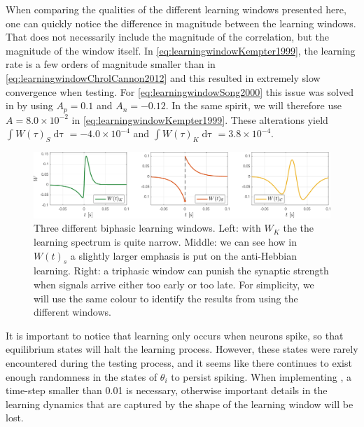 When comparing the qualities of the different learning windows presented here, one can quickly notice the difference in magnitude between the learning windows. That does not necessarily include the magnitude of the correlation, but the magnitude of the window itself. In \eqref{eq:learningwindowKempter1999}, the learning rate is a few orders of magnitude smaller than in \eqref{eq:learningwindowChrolCannon2012} and this resulted in extremely slow convergence when testing. For \eqref{eq:learningwindowSong2000} this issue was solved in \cite{ChrolCannon2012} by using $A _p = 0.1$ and $A_n = -0.12$. In the same spirit, we will therefore use $A = 8.0 \times 10^{-2}$ in \eqref{eq:learningwindowKempter1999}. These alterations yield $\int W(\tau)_S \mathop{d \tau} = -4.0 \times 10^{-4}$ and $\int W(\tau)_K \mathop{d \tau} = 3.8 \times 10^{-4}$.\\


\begin{figure}[H]
\centering
\includegraphics[width = \textwidth]{../Figures/Learning/LearningWindows.pdf}
\caption{Three different biphasic learning windows. Left: with $W_K$ the the learning spectrum is quite narrow. Middle: we can see how in $W(t)_s$ a slightly larger emphasis is put on the anti-Hebbian learning. Right: a triphasic window can punish the synaptic strength when signals arrive either too early or too late. For simplicity, we will use the same colour to identify the results from using the different windows.}
\label{fig:LearningWindows}
\end{figure}

It is important to notice that learning only occurs when neurons spike, so that equilibrium states will halt the learning process. However, these states were rarely encountered during the testing process, and it seems like there continues to exist enough randomness in the states of $\theta_i$ to persist spiking.
When implementing \STDP, a time-step smaller than 0.01 is necessary, otherwise important details in the learning dynamics that are captured by the shape of the learning window will be lost. 

